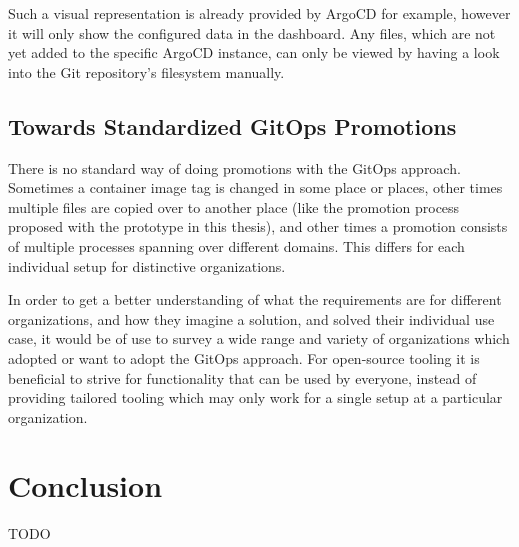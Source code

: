 Such a visual representation is already provided by ArgoCD for example,
however it will only show the configured data in the dashboard.
Any files, which are not yet added to the specific ArgoCD instance,
can only be viewed by having a look into the Git repository's filesystem manually.




\section*{Towards Standardized GitOps Promotions}

There is no standard way of doing promotions with the GitOps approach.
Sometimes a container image tag is changed in some place or places,
other times multiple files are copied over to another place (like the promotion process proposed with the prototype in this thesis),
and other times a promotion consists of multiple processes spanning over different domains.
This differs for each individual setup for distinctive organizations.

In order to get a better understanding of what the requirements are for different organizations,
and how they imagine a solution, and solved their individual use case,
it would be of use to survey a wide range and variety of organizations which adopted or want to adopt the GitOps approach.
For open-source tooling it is beneficial to strive for functionality that can be used by everyone,
instead of providing tailored tooling which may only work for a single setup at a particular organization.

















\chapter{Conclusion}
\label{conclusion}

TODO


%
%
%
%

